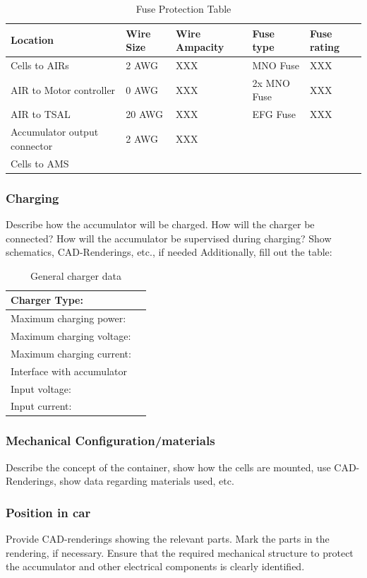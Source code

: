 \begin{table}[H]
	\centering
	\caption{Fuse Protection Table}
	\begin{tabularx}{\textwidth}{|X|X|X|X|X|}
		\hline
		Location & Wire Size & Wire Ampacity & Fuse type & Fuse rating\\[\TableSize]
		\hline
		Cells to AIRs & 2 AWG & XXX & MNO Fuse & XXX \\[\TableSize]
		\hline
		AIR to Motor controller & 0 AWG & XXX & 2x MNO Fuse & XXX \\[\TableSize]
		\hline
		AIR to TSAL & 20 AWG & XXX & EFG Fuse & XXX \\[\TableSize]
		\hline
		Accumulator output connector & 2 AWG & XXX &     &  \\[\TableSize]
		\hline
		Cells to AMS &     &     &     &  \\[\TableSize]
		\hline
	\end{tabularx}%
	\label{tab:acc-fuse-protection}%
\end{table}%

\subsubsection{Charging}
Describe how the accumulator will be charged. How will the charger be connected? How will the accumulator be supervised during charging? Show schematics, CAD-Renderings, etc., if needed
Additionally, fill out the table:

\begin{table}[H]
	\centering
	\caption{General charger data}
	\begin{tabularx}{\textwidth}{|X|X|}
		\hline
		Charger Type: & \\[\TableSize]
		\hline
		Maximum charging power: &\\[\TableSize]
		\hline
		Maximum charging voltage: &  \\[\TableSize]
		\hline
		Maximum charging current: &  \\[\TableSize]
		\hline
		Interface with accumulator &  \\[\TableSize]
		\hline
		Input voltage: & \\[\TableSize]
		\hline
		Input current: &  \\[\TableSize]
		\hline
	\end{tabularx}%
	\label{tab:acc-charger}%
\end{table}%

\subsubsection{Mechanical Configuration/materials}
Describe the concept of the container, show how the cells are mounted, use CAD-Renderings, show data regarding materials used, etc.

\subsubsection{Position in car}
Provide CAD-renderings showing the relevant parts. Mark the parts in the rendering, if necessary.  Ensure that the required mechanical structure to protect the accumulator and other electrical components is clearly identified.






